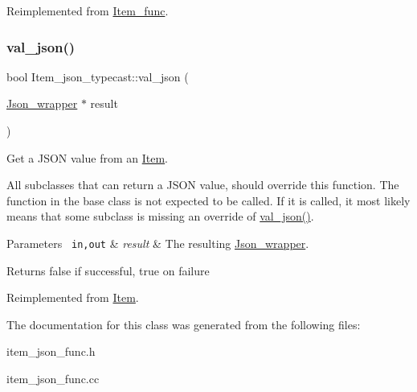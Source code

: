 Reimplemented from \mbox{\hyperlink{classItem__func_afb302ee25d4721ace27d3f5053d4ee41}{Item\+\_\+func}}.

\mbox{\label{classItem__json__typecast_a09e8b9b3ec04c6e654bbb540f47d7b91}} 
\subsubsection{\texorpdfstring{val\+\_\+json()}{val\_json()}}
{\footnotesize\ttfamily bool Item\+\_\+json\+\_\+typecast\+::val\+\_\+json (\begin{DoxyParamCaption}\item[{\mbox{\hyperlink{classJson__wrapper}{Json\+\_\+wrapper}} $\ast$}]{result }\end{DoxyParamCaption})\hspace{0.3cm}{\ttfamily [virtual]}}

Get a J\+S\+ON value from an \mbox{\hyperlink{classItem}{Item}}.

All subclasses that can return a J\+S\+ON value, should override this function. The function in the base class is not expected to be called. If it is called, it most likely means that some subclass is missing an override of \mbox{\hyperlink{classItem__json__typecast_a09e8b9b3ec04c6e654bbb540f47d7b91}{val\+\_\+json()}}.


\begin{DoxyParams}[1]{Parameters}
\mbox{\texttt{ in,out}}  & {\em result} & The resulting \mbox{\hyperlink{classJson__wrapper}{Json\+\_\+wrapper}}.\\
\hline
\end{DoxyParams}
\begin{DoxyReturn}{Returns}
false if successful, true on failure 
\end{DoxyReturn}


Reimplemented from \mbox{\hyperlink{classItem_a57e763fcde2d0a819d21e31c59611290}{Item}}.



The documentation for this class was generated from the following files\+:\begin{DoxyCompactItemize}
\item 
item\+\_\+json\+\_\+func.\+h\item 
item\+\_\+json\+\_\+func.\+cc\end{DoxyCompactItemize}
